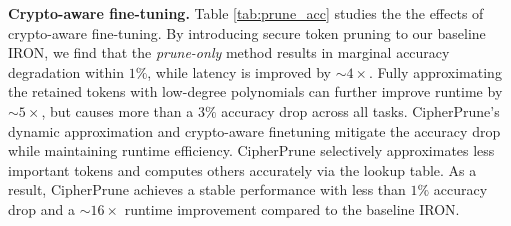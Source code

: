 

\noindent\textbf{Crypto-aware fine-tuning.}
Table \ref{tab:prune_acc} studies the the effects of crypto-aware fine-tuning. 
By introducing secure token pruning to our baseline IRON, we find that the \textit{prune-only} method results in marginal accuracy degradation within $1\%$, while latency is improved by $\sim4\times$. Fully approximating the retained tokens with low-degree polynomials can further improve runtime by $\sim 5\times$, but causes more than a $3\%$ accuracy drop across all tasks. CipherPrune's dynamic approximation and crypto-aware finetuning mitigate the accuracy drop while maintaining runtime efficiency. CipherPrune selectively approximates less important tokens and computes others accurately via the lookup table. As a result, CipherPrune achieves a stable performance with less than $1\%$ accuracy drop and a $\sim 16 \times$ runtime improvement compared to the baseline IRON.

